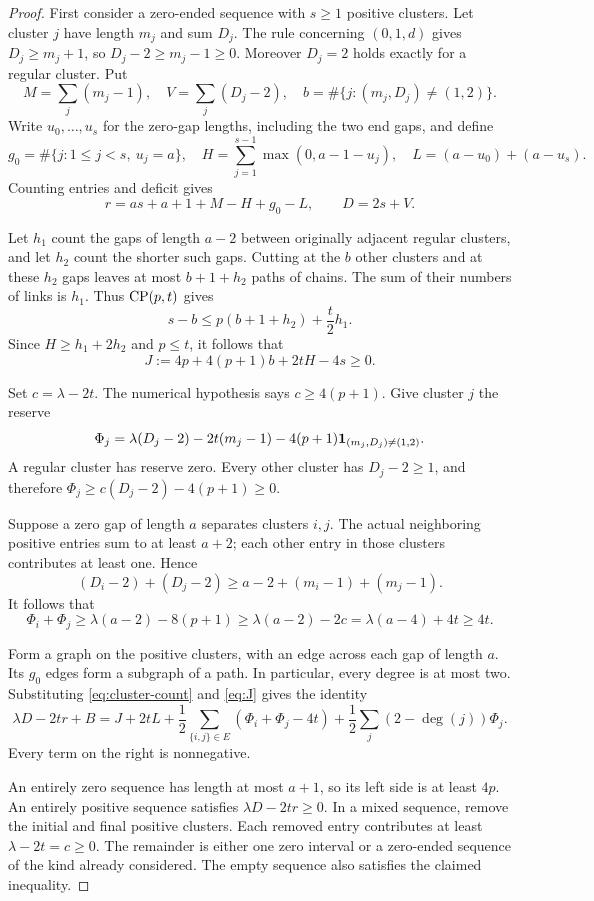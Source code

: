 \begin{proof}
First consider a zero-ended sequence with $s\ge1$ positive clusters.
Let cluster $j$ have length $m_j$ and sum $D_j$. The rule concerning
$(0,1,d)$ gives $D_j\ge m_j+1$, so $D_j-2\ge m_j-1\ge0$.
Moreover $D_j=2$ holds exactly for a regular cluster. Put
\[
 M=\sum_j(m_j-1),\quad V=\sum_j(D_j-2),\quad
 b=\#\{j:(m_j,D_j)\ne(1,2)\}.
\]
Write $u_0,\ldots,u_s$ for the zero-gap lengths, including the two end
gaps, and define
\[
 g_0=\#\{j:1\le j<s,\ u_j=a\},\quad
 H=\sum_{j=1}^{s-1}\max(0,a-1-u_j),\quad
 L=(a-u_0)+(a-u_s).
\]
Counting entries and deficit gives
\begin{equation}\label{eq:cluster-count}
 r=as+a+1+M-H+g_0-L,\qquad D=2s+V.
\end{equation}

Let $h_1$ count the gaps of length $a-2$ between originally adjacent
regular clusters, and let $h_2$ count the shorter such gaps. Cutting
at the $b$ other clusters and at these $h_2$ gaps leaves at most
$b+1+h_2$ paths of chains. The sum of their numbers of links is $h_1$.
Thus $\operatorname{CP}(p,t)$ gives
\[
 s-b\le p(b+1+h_2)+\frac t2h_1.
\]
Since $H\ge h_1+2h_2$ and $p\le t$, it follows that
\begin{equation}\label{eq:J}
 J:=4p+4(p+1)b+2tH-4s\ge0.
\end{equation}

Set $c=\lambda-2t$. The numerical hypothesis says $c\ge4(p+1)$.
Give cluster $j$ the reserve
\[
 \Phi_j=\lambda(D_j-2)-2t(m_j-1)
       -4(p+1)\mathbf{1}_{(m_j,D_j)\ne(1,2)}.
\]
A regular cluster has reserve zero. Every other cluster has
$D_j-2\ge1$, and therefore
$\Phi_j\ge c(D_j-2)-4(p+1)\ge0$.

Suppose a zero gap of length $a$ separates clusters $i,j$.
The actual neighboring positive entries sum to at least $a+2$;
each other entry in those clusters contributes at least one. Hence
\[
 (D_i-2)+(D_j-2)\ge a-2+(m_i-1)+(m_j-1).
\]
It follows that
\[
 \Phi_i+\Phi_j\ge\lambda(a-2)-8(p+1)
 \ge\lambda(a-2)-2c
 =\lambda(a-4)+4t\ge4t.
\]

Form a graph on the positive clusters, with an edge across each gap
of length $a$. Its $g_0$ edges form a subgraph of a path. In particular,
every degree is at most two. Substituting \eqref{eq:cluster-count}
and \eqref{eq:J} gives the identity
\[
 \lambda D-2tr+B
 =J+2tL
 +\frac12\sum_{\{i,j\}\in E}(\Phi_i+\Phi_j-4t)
 +\frac12\sum_j(2-\deg(j))\Phi_j.
\]
Every term on the right is nonnegative.

An entirely zero sequence has length at most $a+1$, so its left side
is at least $4p$. An entirely positive sequence satisfies
$\lambda D-2tr\ge0$. In a mixed sequence, remove the initial and
final positive clusters. Each removed entry contributes at least
$\lambda-2t=c\ge0$. The remainder is either one zero interval or a
zero-ended sequence of the kind already considered. The empty sequence
also satisfies the claimed inequality.
\end{proof}
